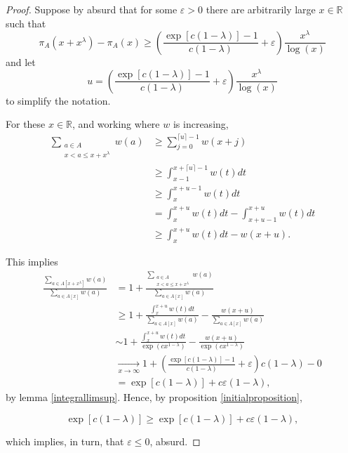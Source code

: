 \documentclass[11pt]{amsart}
\numberwithin{equation}{section}
\newcommand{\R}{\mathbb{R}}
\newcommand{\pun}[1]{\lceil #1 \rceil}
\newcommand{\disum}{\displaystyle \sum}
\newcommand{\diint}{\displaystyle \int}
\newcommand{\difrac}{\displaystyle \frac}
\begin{document}
\begin{proof} Suppose by absurd that for some $\varepsilon > 0$ there are arbitrarily large $x \in \R$ such that $$\pi_A(x + x^\lambda) - \pi_A(x) \geq \left(\difrac{\exp[c(1 - \lambda)] - 1}{c(1 - \lambda)} + \varepsilon\right) \difrac{x^\lambda}{\log(x)}$$ and let $$u = \left(\difrac{\exp[c(1 - \lambda)] - 1}{c(1 - \lambda)} + \varepsilon\right) \difrac{x^\lambda}{\log(x)}$$ to simplify the notation.

For these $x \in \R$, and working where $w$ is increasing, \begin{equation*} \begin{split} \disum_{\substack{a \in A \\ x < a \leq x+x^\lambda}} w(a) & \geq \disum_{j = 0}^{\pun{u} - 1} w(x+j) \\ & \geq \diint_{x-1}^{x + \pun{u} - 1} w(t) dt \\ & \geq \diint_{x}^{x + u - 1} w(t) dt \\ & = \diint_{x}^{x + u} w(t) dt - \diint_{x + u - 1}^{x + u} w(t) dt \\ & \geq \diint_{x}^{x + u} w(t) dt - w(x + u). \end{split} \end{equation*}

This implies \begin{equation*} \begin{split} \difrac{\disum_{a \in A[x+x^\lambda]} w(a)}{\disum_{a \in A[x]} w(a)} & = 1 + \difrac{\disum_{\substack{a \in A \\ x < a \leq x+x^\lambda}} w(a)}{\disum_{a \in A[x]} w(a)} \\ & \geq 1 + \difrac{\diint_{x}^{x + u} w(t) dt}{\disum_{a \in A[x]} w(a)} - \difrac{w(x + u)}{\disum_{a \in A[x]} w(a)} \\ & \sim 1 + \difrac{\diint_{x}^{x + u} w(t) dt}{\exp(cx^{1 - \lambda})} - \difrac{w(x + u)}{\exp(cx^{1 - \lambda})} \\ & \xrightarrow[x \to \infty]{} 1 + \left(\difrac{\exp[c(1 - \lambda)] - 1}{c(1 - \lambda)} + \varepsilon\right)c(1 - \lambda) - 0 \\ & = \exp[c(1 - \lambda)] + c\varepsilon(1 - \lambda),\end{split} \end{equation*} by lemma \ref{integrallimsup}. Hence, by proposition \ref{initialproposition},

\vspace{-3mm}

$$\exp[c(1 - \lambda)] \geq \exp[c(1 - \lambda)] + c\varepsilon(1 - \lambda),$$

\vspace{1mm}

\noindent which implies, in turn, that $\varepsilon \leq 0$, absurd. \end{proof}
\end{document}
